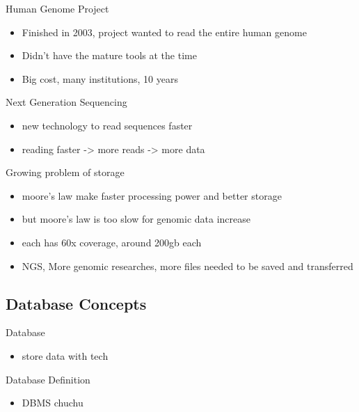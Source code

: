 \documentclass{beamer}
\begin{document}
\begin{frame}{Human Genome Project}
  \begin{itemize}   
    \item Finished in 2003, project wanted to read the entire human genome
    \item Didn't have the mature tools at the time
    \item Big cost, many institutions, 10 years \cite{introgenomics}
  \end{itemize}
\end{frame}

\begin{frame}{Next Generation Sequencing}
  \begin{itemize}   
    \item new technology to read sequences faster
    \item reading faster -> more reads -> more data
  \end{itemize}
\end{frame}

\begin{frame}{Growing problem of storage}
  \begin{itemize}   
    \item moore's law make faster processing power and better storage
    \item but moore's law is too slow for genomic data increase
    \item each has 60x coverage, around 200gb each
    \item NGS, More genomic researches, more files needed to be saved and transferred
  \end{itemize}
\end{frame}

\subsection{Database Concepts}
\begin{frame}{Database}
  \begin{itemize}   
    \item store data with tech
  \end{itemize}
\end{frame}

\begin{frame}{Database Definition}
  \begin{itemize}   
    \item DBMS chuchu
  \end{itemize}
\end{frame}
\end{document}
